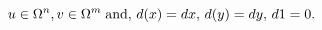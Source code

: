 \begin{equation}
u\in \Omega ^n,v\in \Omega ^m\;\hbox{and},\, d(x)=dx,\, d(y)=dy,%
\, d1=0.
\end{equation}

